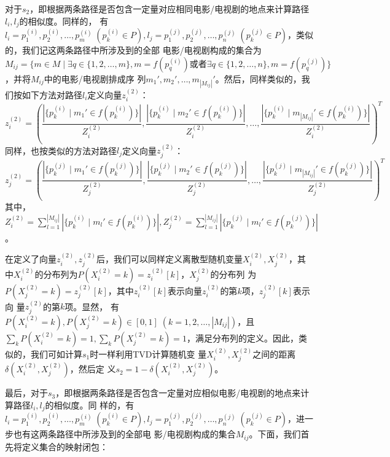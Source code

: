 对于$s_2$，即根据两条路径是否包含一定量对应相同电影/电视剧的地点来计算路径$l_i,l_j$的相似度。同样的，
有$l_i=p^{(i)}_1,p^{(i)}_2,\dots,p^{(i)}_m\;(p^{(i)}_k\in P),
l_j=p^{(j)}_1,p^{(j)}_2,\dots,p^{(j)}_n\;(p^{(j)}_k\in P)$，类似的，我们记这两条路径中所涉及到的全部
电影/电视剧构成的集合为$M_{ij}=\{m\in M\mid \exists q\in\{1,2,\dots,m\},m=f(p^{(i)}_q)\text{或者}
\exists
q\in\{1,2,\dots,n\},m=f(p^{(j)}_q)\}$，并将$M_{ij}$中的电影/电视剧排成序
列$m_1',m_2',\dots,m_{|M_{ij}|}'$。然后，同样类似的，我们按如下方法对路径$l_i$定义向量$z_i^{(2)}$：
\begin{displaymath}
  z_i^{(2)}=\left(\frac{\left |\{p^{(i)}_k\mid m_1'\in f(p^{(i)}_k)\}\right |}{Z^{(2)}_i}, \frac{\left |\{p^{(i)}_k\mid
        m_2'\in f(p^{(i)}_k)\}\right |}{Z^{(2)}_i},
    \dots,
    \frac{\left |\{p^{(i)}_k\mid m_{|M_{ij}|}'\in f(p^{(i)}_k)\}\right |}{Z^{(2)}_i}\right)^T
\end{displaymath}
同样，也按类似的方法对路径$l_j$定义向量$z_j^{(2)}$：
\begin{displaymath}
  z_j^{(2)}=\left(\frac{\left |\{p^{(j)}_k\mid m_1'\in f(p^{(j)}_k)\}\right |}{Z^{(2)}_j}, \frac{\left |\{p^{(j)}_k\mid
        m_2'\in f(p^{(j)}_k)\}\right |}{Z^{(2)}_j},
    \dots,
    \frac{\left |\{p^{(j)}_k\mid m_{|M_{ij}|}'\in f(p^{(j)}_k)\}\right |}{Z^{(2)}_j}\right)^T
\end{displaymath}
其中，$Z^{(2)}_i=\sum_{l=1}^{|M_{ij}|}\left |\{p^{(i)}_k\mid m_l'\in f(p^{(i)}_k)\}\right |,Z^{(2)}_j=\sum_{l=1}^{|M_{ij}|}\left |\{p^{(j)}_k\mid m_l'\in f(p^{(j)}_k)\}\right |$。

在定义了向量$z_i^{(2)},z_j^{(2)}$后，我们可以同样定义离散型随机变量$X_i^{(2)},X_j^{(2)}$，其
中$X_i^{(2)}$的分布列为$P(X_i^{(2)}=k)=z_i^{(2)}[k]$，$X_j^{(2)}$的分布列
为$P(X_j^{(2)}=k)=z_j^{(2)}[k]$，其中$z_i^{(2)}[k]$表示向量$z_i^{(2)}$的第$k$项，$z_j^{(2)}[k]$表示向
量$z_j^{(2)}$的第$k$项。显然，
有$P(X_i^{(2)}=k),P(X_j^{(2)}=k)\in[0,1]\;(k=1,2,\dots,|M_{ij}|)$，且$\sum_kP(X_i^{(2)}=k)=1,
\sum_kP(X_j^{(2)}=k)=1$，满足分布列的定义。因此，类似的，我们可如计算$s_1$时一样利用TVD计算随机变
量$X_i^{(2)},X_j^{(2)}$之间的距离$\delta(X_i^{(2)},X_j^{(2)})$，然后定
义$s_2=1-\delta(X_i^{(2)},X_j^{(2)})$。

最后，对于$s_3$，即根据两条路径是否包含一定量对应相似电影/电视剧的地点来计算路径$l_i,l_j$的相似度。同
样的，有$l_i=p^{(i)}_1,p^{(i)}_2,\dots,p^{(i)}_m\;(p^{(i)}_k\in P),
l_j=p^{(j)}_1,p^{(j)}_2,\dots,p^{(j)}_n\;(p^{(j)}_k\in P)$，进一步也有这两条路径中所涉及到的全部电
影/电视剧构成的集合$M_{ij}$。下面，我们首先将定义集合的映射闭包：

